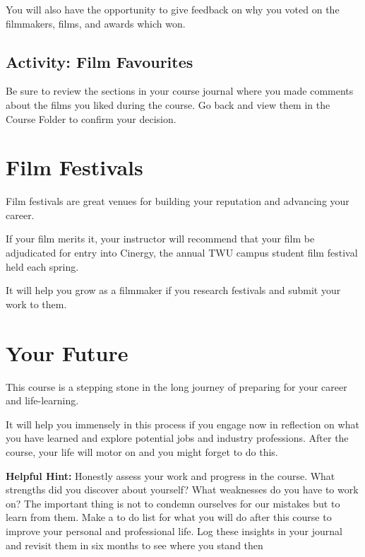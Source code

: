 \documentclass[
  letterpaper,
  DIV=11,
  numbers=noendperiod]{scrreprt}
\begin{document}
You will also have the opportunity to give feedback on why you voted on
the filmmakers, films, and awards which won.

\subsection{Activity: Film Favourites}\label{activity-film-favourites}

\begin{tcolorbox}[enhanced jigsaw, opacityback=0, colframe=quarto-callout-note-color-frame, leftrule=.75mm, arc=.35mm, rightrule=.15mm, colbacktitle=quarto-callout-note-color!10!white, titlerule=0mm, colback=white, toprule=.15mm, bottomtitle=1mm, breakable, toptitle=1mm, title={Learning Activity}, coltitle=black, bottomrule=.15mm, left=2mm, opacitybacktitle=0.6]

Be sure to review the sections in your course journal where you made
comments about the films you liked during the course. Go back and view
them in the Course Folder to confirm your decision.

\end{tcolorbox}

\section{Film Festivals}\label{film-festivals}

Film festivals are great venues for building your reputation and
advancing your career.

If your film merits it, your instructor will recommend that your film be
adjudicated for entry into Cinergy, the annual TWU campus student film
festival held each spring.

It will help you grow as a filmmaker if you research festivals and
submit your work to them.

\section{Your Future}\label{your-future}

This course is a stepping stone in the long journey of preparing for
your career and life-learning.

It will help you immensely in this process if you engage now in
reflection on what you have learned and explore potential jobs and
industry professions. After the course, your life will motor on and you
might forget to do this.

\textbf{Helpful Hint:} Honestly assess your work and progress in the
course. What strengths did you discover about yourself? What weaknesses
do you have to work on? The important thing is not to condemn ourselves
for our mistakes but to learn from them. Make a to do list for what you
will do after this course to improve your personal and professional
life. Log these insights in your journal and revisit them in six months
to see where you stand then
\end{document}
